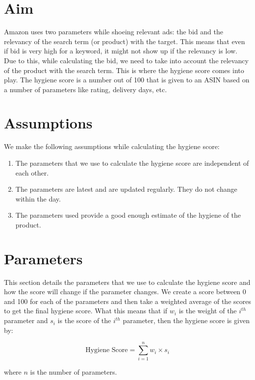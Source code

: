 \section{Aim}
\label{sec:hygiene}
Amazon uses two parameters while shoeing relevant ads: the bid and the relevancy of the search term (or product) with the target. This means that even if bid is very high for a keyword, it might not show up if the relevancy is low. Due to this, while calculating the bid, we need to take into account the relevancy of the product with the search term. This is where the hygiene score comes into play. The hygiene score is a number out of 100 that is given to an ASIN based on a number of parameters like rating, delivery days, etc.

\section{Assumptions}

We make the following assumptions while calculating the hygiene score:

\begin{enumerate}
    \item The parameters that we use to calculate the hygiene score are independent of each other.
    \item The parameters are latest and are updated regularly. They do not change within the day.
    \item The parameters used provide a good enough estimate of the hygiene of the product.
\end{enumerate}

\section{Parameters}

This section details the parameters that we use to calculate the hygiene score and how the score will change if the parameter changes. We create a score between 0 and 100 for each of the parameters and then take a weighted average of the scores to get the final hygiene score. What this means that if \(w_i\) is the weight of the \(i^{th}\) parameter and \(s_i\) is the score of the \(i^{th}\) parameter, then the hygiene score is given by:

\begin{equation}
    \text{Hygiene Score} = \sum_{i=1}^{n} w_i \times s_i
\end{equation}

where \(n\) is the number of parameters.

